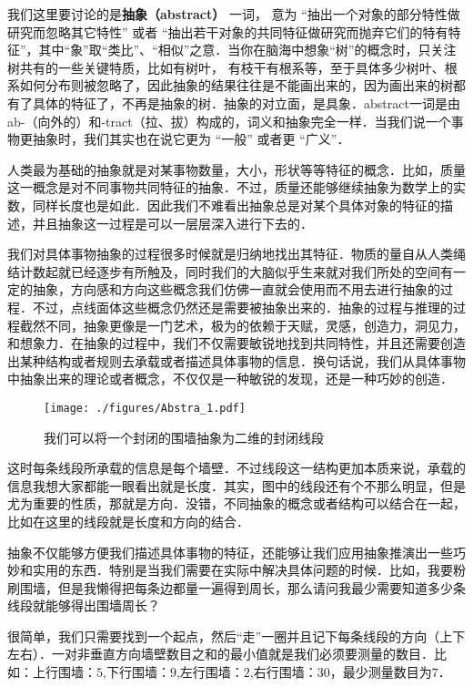 
我们这里要讨论的是\textbf{抽象（abstract）} 一词， 意为 “抽出一个对象的部分特性做研究而忽略其它特性” 或者 “抽出若干对象的共同特征做研究而抛弃它们的特有特征”，其中“象”取“类比”、“相似”之意．当你在脑海中想象“树”的概念时，只关注树共有的一些关键特质，比如有树叶， 有枝干有根系等，至于具体多少树叶、根系如何分布则被忽略了，因此抽象的结果往往是不能画出来的，因为画出来的树都有了具体的特征了，不再是抽象的树．抽象的对立面，是具象．abstract一词是由ab-（向外的）和-tract（拉、拔）构成的，词义和抽象完全一样．当我们说一个事物更抽象时，我们其实也在说它更为 “一般” 或者更 “广义”．


人类最为基础的抽象就是对某事物数量，大小，形状等等特征的概念．比如，质量这一概念是对不同事物共同特征的抽象．不过，质量还能够继续抽象为数学上的实数，同样长度也是如此．因此我们不难看出抽象总是对某个具体对象的特征的描述，并且抽象这一过程是可以一层层深入进行下去的．

我们对具体事物抽象的过程很多时候就是归纳地找出其特征．物质的量自从人类绳结计数起就已经逐步有所触及，同时我们的大脑似乎生来就对我们所处的空间有一定的抽象，方向感和方向这些概念我们仿佛一直就会使用而不用去进行抽象的过程．不过，点线面体这些概念仍然还是需要被抽象出来的．抽象的过程与推理的过程截然不同，抽象更像是一门艺术，极为的依赖于天赋，灵感，创造力，洞见力，和想象力．在抽象的过程中，我们不仅需要敏锐地找到共同特性，并且还需要创造出某种结构或者规则去承载或者描述具体事物的信息．换句话说，我们从具体事物中抽象出来的理论或者概念，不仅仅是一种敏锐的发现，还是一种巧妙的创造．

\begin{figure}[ht]
\centering
\texttt{[image: ./figures/Abstra\_1.pdf]}
\caption{我们可以将一个封闭的围墙抽象为二维的封闭线段} \label{Abstra_fig1}
\end{figure}

这时每条线段所承载的信息是每个墙壁．不过线段这一结构更加本质来说，承载的信息我想大家都能一眼看出就是长度．其实，图中的线段还有个不那么明显，但是尤为重要的性质，那就是方向．没错，不同抽象的概念或者结构可以结合在一起，比如在这里的线段就是长度和方向的结合．

抽象不仅能够方便我们描述具体事物的特征，还能够让我们应用抽象推演出一些巧妙和实用的东西．特别是当我们需要在实际中解决具体问题的时候．比如，我要粉刷围墙，但是我懒得把每条边都量一遍得到周长，那么请问我最少需要知道多少条线段就能够得出围墙周长？

很简单，我们只需要找到一个起点，然后“走”一圈并且记下每条线段的方向（上下左右）．一对非垂直方向墙壁数目之和的最小值就是我们必须要测量的数目．比如：上行围墙：$5$,下行围墙：$9$,左行围墙：$2$,右行围墙：$30$，最少测量数目为$7$．

